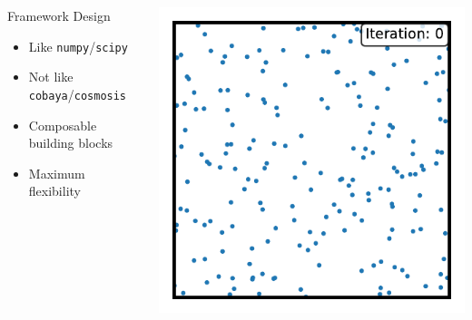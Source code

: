 \documentclass[aspectratio=169]{beamer}
\begin{document}
\begin{frame}
\begin{columns}
\begin{block}{Framework Design}
\begin{itemize}
                \item Like \texttt{numpy}/\texttt{scipy}
                \item Not like \texttt{cobaya}/\texttt{cosmosis}
                \item Composable building blocks
                \item Maximum flexibility
            \end{itemize}
        \end{block}
        \vspace{10pt}
        \begin{center}
            \includegraphics[width=\textwidth,page=8]{figures/himmelblau_ns.pdf}
        \end{center}
    \end{columns}
\end{frame}
\end{document}
